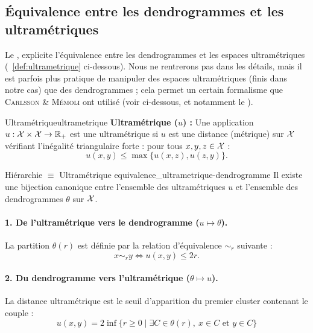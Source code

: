 \subsection{Équivalence entre les dendrogrammes et les ultramétriques}

Le , explicite l'équivalence entre les dendrogrammes et les espaces ultramétriques (\Def~\ref{def:ultrametrique} ci-dessous).
Nous ne rentrerons pas dans les détails, mais il est parfois plus pratique de manipuler des espaces ultramétriques (finis dans notre cas) que des dendrogrammes ; cela permet un certain formalisme que \textsc{Carlsson \& Mémoli} ont utilisé (voir ci-dessous, et notamment le ).

\begin{Definition}{Ultramétrique}{ultrametrique}
    \textbf{Ultramétrique ($u$) :} Une application $u : \mathcal{X} \times \mathcal{X} \to \mathbb{R}_+$ est une ultramétrique si $u$ est une distance (métrique) sur $\mathcal{X}$ vérifiant l'inégalité triangulaire forte : pour tous $x, y, z \in \mathcal{X}$ :
    \[
    \boxed{
        u(x, y) \leq \max \bigl\{ u(x, z), u(z, y) \bigr\}.
        }
    \]
\end{Definition}



\begin{Resultat}{Hiérarchie $\equiv$ Ultramétrique \cite{Johnson1967}}{equivalence_ultrametrique-dendrogramme}
Il existe une bijection canonique entre l'ensemble des ultramétriques $u$ et l'ensemble des dendrogrammes $\theta$ sur $\mathcal{X}$.

\paragraph{1. De l'ultramétrique vers le dendrogramme ($u \mapsto \theta$).}
La partition $\theta(r)$ est définie par la relation d'équivalence $\sim_r$ suivante :
\[
\boxed{
    x \sim_r y \iff u(x, y) \leq 2r .
    }
\]

\paragraph{2. Du dendrogramme vers l'ultramétrique ($\theta \mapsto u$).}
La distance ultramétrique est le seuil d'apparition du premier cluster contenant le couple :
\begin{equation}\label{eq:ancetre_commun}
\boxed{
    u(x, y) = 2\inf \{ r \geq 0 \mid \exists C \in \theta(r), \ x \in C \text{ et } y \in C \}
    }
\end{equation}
\end{Resultat}




